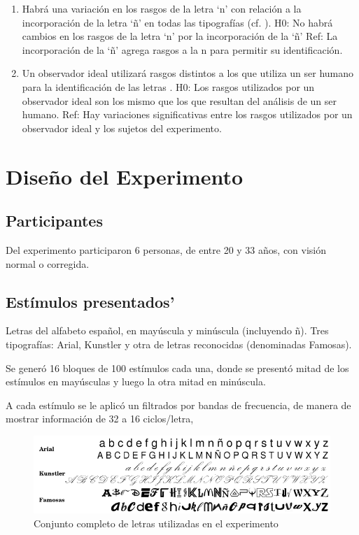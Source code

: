 \documentclass[runningheads,a4paper]{llncs}
\begin{document}
\begin{enumerate}
 \item Habrá una variación en los rasgos de la letra `n' con relación a la incorporación de la letra `ñ' en todas las tipografías (cf. \cite{FisetEtAl08:BubblesForLetters}).
    \subitem H0: No habrá cambios en los rasgos de la letra `n' por la incorporación de la `ñ'
    \subitem Ref: La incorporación de la `ñ' agrega rasgos a la n para permitir su identificación.
 \item Un observador ideal utilizará rasgos distintos a los que utiliza un ser humano para la identificación de las letras \cite{PelliEtAl06:LetterIdentification}.
    \subitem H0: Los rasgos utilizados por un observador ideal son los mismo que los que resultan del análisis de un ser humano.
    \subitem Ref: Hay variaciones significativas entre los rasgos utilizados por un observador ideal y los sujetos del experimento.
\end{enumerate}


\section{Dise\~no del Experimento}
\label{sec:DisenoExperimento}

\subsection{Participantes}

Del experimento participaron 6 personas, de entre 20 y 33 años, con visión normal o corregida.

\subsection{Est\'imulos presentados'}
Letras del alfabeto español, en mayúscula y minúscula (incluyendo ñ).
Tres tipografías: Arial, Kunstler y otra de letras reconocidas (denominadas Famosas).

Se generó 16 bloques de 100 estímulos cada una, donde se presentó mitad de los estímulos en mayúsculas y luego la otra mitad en minúscula.

A cada estímulo se le aplicó un filtrados por bandas de frecuencia, de manera de mostrar información de 32 a 16 ciclos/letra,

\begin{figure}
 \includegraphics[scale=0.60]{letras.png}
  \caption{Conjunto completo de letras utilizadas en el experimento}
  \label{figura:conjuntoLetras}
\end{figure}
\end{document}
